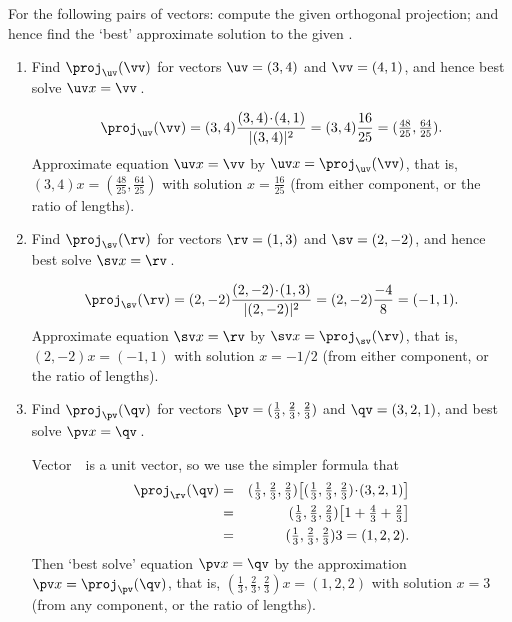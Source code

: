 \begin{example} \label{eg:projline}
For the following pairs of vectors: 
compute the given orthogonal projection; 
and hence find the `best' approximate solution to the given .
\begin{enumerate}
\item Find \(\proj_\uv(\vv)\) for vectors \(\uv=(3,4)\) and \(\vv=(4,1)\), and hence best solve \(\uv x=\vv\)\,.
\begin{solution} 
\begin{equation*}
\proj_\uv(\vv)=(3,4)\frac{(3,4)\cdot(4,1)}{|(3,4)|^2}
=(3,4)\frac{16}{25}
=(\tfrac{48}{25},\tfrac{64}{25}).
\end{equation*}
Approximate equation \(\uv x=\vv\) by \(\uv x=\proj_\uv(\vv)\), that is, \((3,4)x=(\tfrac{48}{25},\tfrac{64}{25})\) with solution \(x=\tfrac{16}{25}\) (from either component, or the ratio of lengths).
\end{solution}

\item Find \(\proj_\sv(\rv)\) for vectors \(\rv=(1,3)\) and \(\sv=(2,-2)\), and hence best solve \(\sv x=\rv\)\,.
\begin{solution} 
\begin{equation*}
\proj_\sv(\rv)=(2,-2)\frac{(2,-2)\cdot(1,3)}{|(2,-2)|^2}
=(2,-2)\frac{-4}{8}
=(-1,1).
\end{equation*}
Approximate equation \(\sv x=\rv\) by \(\sv x=\proj_\sv(\rv)\), that is, \((2,-2)x=(-1,1)\) with solution \(x=-1/2\)  (from either component, or the ratio of lengths).
\end{solution}

\item Find \(\proj_\pv(\qv)\) for vectors \(\pv=(\tfrac13,\tfrac23,\tfrac23)\) and \(\qv=(3,2,1)\), and best solve \(\pv x=\qv\)\,.
\begin{solution} 
Vector~\rv\ is a unit vector, so we use the simpler formula that
\begin{eqnarray*}
\proj_\rv(\qv)&=& (\tfrac13,\tfrac23,\tfrac23)\big[(\tfrac13,\tfrac23,\tfrac23)\cdot(3,2,1)\big]
\\&=&(\tfrac13,\tfrac23,\tfrac23)\big[1+\tfrac43+\tfrac23\big] 
\\&=&(\tfrac13,\tfrac23,\tfrac23)3
=(1,2,2).
\end{eqnarray*}
Then `best solve' equation \(\pv x=\qv\) by the approximation \(\pv x=\proj_\pv(\qv)\), that is, \((\tfrac13,\tfrac23,\tfrac23)x=(1,2,2)\) with solution \(x=3\) (from any component, or the ratio of lengths).
\end{solution}
\end{enumerate}
\end{example}




